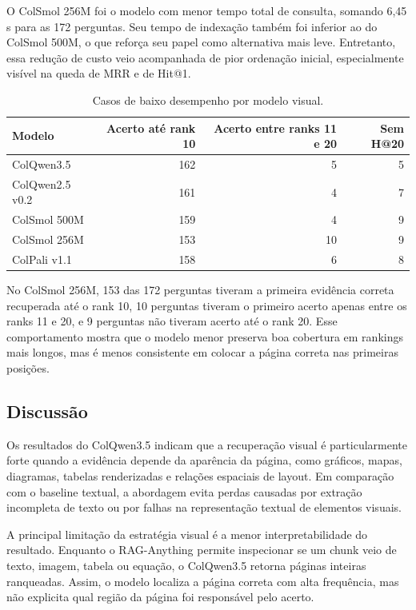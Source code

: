O ColSmol 256M foi o modelo com menor tempo total de consulta, somando 6,45 s para as 172 perguntas. Seu tempo de indexação também foi inferior ao do ColSmol 500M, o que reforça seu papel como alternativa mais leve. Entretanto, essa redução de custo veio acompanhada de pior ordenação inicial, especialmente visível na queda de MRR e de Hit@1.

\begin{table}[htbp]
\centering
\caption{Casos de baixo desempenho por modelo visual.}
\label{tab:comparacao-colvision-baixo-desempenho}
\small
\begin{tabular}{l r r r}
\toprule
\textbf{Modelo} & \textbf{Acerto até rank 10} & \textbf{Acerto entre ranks 11 e 20} & \textbf{Sem H@20} \\
\midrule
ColQwen3.5 & 162 & 5 & 5 \\
ColQwen2.5 v0.2 & 161 & 4 & 7 \\
ColSmol 500M & 159 & 4 & 9 \\
ColSmol 256M & 153 & 10 & 9 \\
ColPali v1.1 & 158 & 6 & 8 \\
\bottomrule
\end{tabular}
\end{table}

No ColSmol 256M, 153 das 172 perguntas tiveram a primeira evidência correta recuperada até o rank 10, 10 perguntas tiveram o primeiro acerto apenas entre os ranks 11 e 20, e 9 perguntas não tiveram acerto até o rank 20. Esse comportamento mostra que o modelo menor preserva boa cobertura em rankings mais longos, mas é menos consistente em colocar a página correta nas primeiras posições.

\subsection{Discussão}
\label{subsec:colvision-discussao}

Os resultados do ColQwen3.5 indicam que a recuperação visual é particularmente forte quando a evidência depende da aparência da página, como gráficos, mapas, diagramas, tabelas renderizadas e relações espaciais de layout. Em comparação com o baseline textual, a abordagem evita perdas causadas por extração incompleta de texto ou por falhas na representação textual de elementos visuais.

A principal limitação da estratégia visual é a menor interpretabilidade do resultado. Enquanto o RAG-Anything permite inspecionar se um chunk veio de texto, imagem, tabela ou equação, o ColQwen3.5 retorna páginas inteiras ranqueadas. Assim, o modelo localiza a página correta com alta frequência, mas não explicita qual região da página foi responsável pelo acerto.


